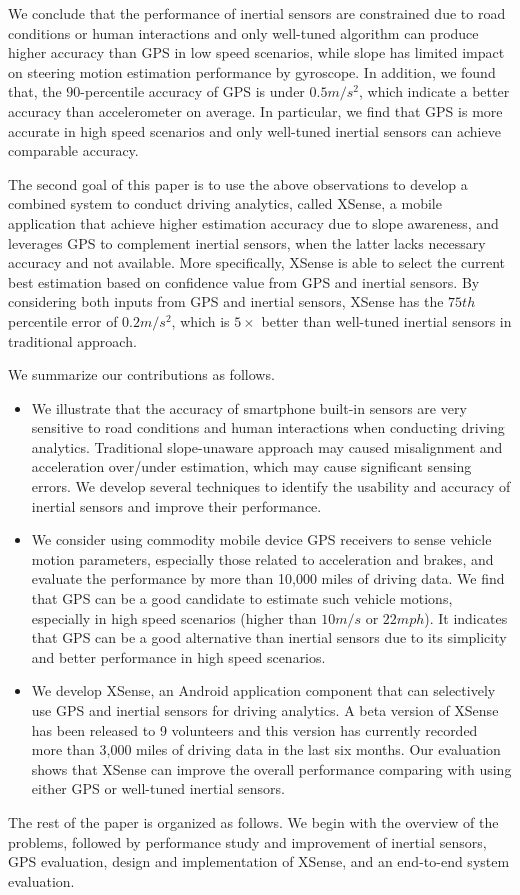 We conclude that the performance of inertial sensors are constrained due to
road conditions or human interactions and only well-tuned algorithm can produce higher accuracy 
than GPS in low speed scenarios, 
while slope has limited impact on steering motion estimation performance by gyroscope. 
In addition, we found that, the $90$-percentile accuracy of GPS is under $0.5m/s^2$, 
which indicate a better accuracy than accelerometer on average. 
In particular, we find that GPS is more accurate in high speed scenarios and 
only well-tuned inertial sensors can achieve comparable accuracy. 


The second goal of this paper is to use the above observations to develop a combined system
to conduct driving analytics, called XSense, a mobile application that achieve
higher estimation accuracy due to slope awareness, and leverages GPS to complement
inertial sensors, when the latter lacks necessary accuracy and not available. 
More specifically,
XSense is able to select the current best estimation 
based on confidence value from GPS and inertial sensors. 
By considering both inputs from GPS and inertial sensors, 
XSense has the $75th$ percentile error of $0.2m/s^2$, 
which is $5\times$ better than well-tuned inertial sensors in traditional approach. 

We summarize our contributions as follows. 

\begin{itemize}[leftmargin=*]


\item We illustrate that the accuracy of smartphone built-in sensors are very sensitive
to road conditions and human interactions when conducting driving analytics. 
Traditional slope-unaware approach may caused misalignment and acceleration over/under
estimation, which may cause significant sensing errors. 
We develop several techniques to identify the usability and accuracy of inertial sensors 
and improve their performance.  


\item We consider using commodity mobile device GPS receivers to sense vehicle
motion parameters, especially those related to acceleration and brakes, 
and evaluate the performance by more than 
10,000 miles of driving data. 
We find that GPS can be a good candidate to estimate such vehicle
motions, especially in high speed scenarios (higher than $10m/s$ or $22mph$). 
It indicates that GPS can be a good alternative than inertial
sensors due to its simplicity and better performance in high speed
scenarios.  



\item We develop XSense, an Android application component that can 
selectively use GPS and inertial sensors for driving analytics. 
A beta version of XSense has been released to 9 volunteers and this version has
currently recorded more than 3,000 miles of driving data in the last six months.
Our evaluation shows that XSense can improve the overall performance 
comparing with using either GPS or well-tuned inertial sensors. 

\end{itemize}

The rest of the paper is organized as follows. 
We begin with the overview of the problems, 
followed by performance study and improvement
of inertial sensors, GPS evaluation, design and implementation of XSense, 
and an end-to-end system evaluation. 







